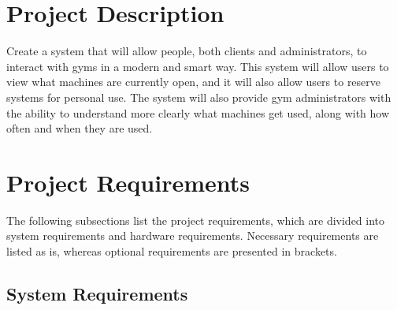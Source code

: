 \documentclass[letterpaper,11pt]{./templates/texMemo} %
\begin{document}
\maketitle 

\section{Project Description}

Create a system that will allow people, both clients and administrators, to interact with gyms in a modern and smart way. This system will allow users to view what machines are currently open, and it will also allow users to reserve systems for personal use. The system will also provide gym administrators with the ability to understand more clearly what machines get used, along with how often and when they are used.

\section{Project Requirements}

The following subsections list the project requirements, which are divided into system requirements and hardware requirements. Necessary requirements are listed as is, whereas optional requirements are presented in brackets.

\subsection{System Requirements}
\end{document}
